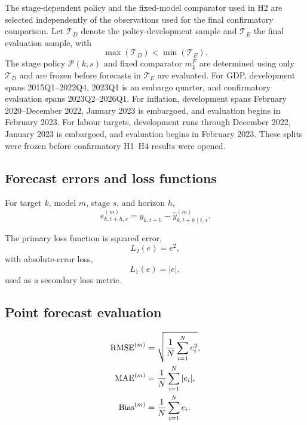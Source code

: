 The stage-dependent policy and the fixed-model comparator used in H2 are selected independently of the observations used for the final confirmatory comparison. Let $\mathcal{T}_{D}$ denote the policy-development sample and $\mathcal{T}_{E}$ the final evaluation sample, with
\begin{equation}
    \max(\mathcal{T}_{D}) < \min(\mathcal{T}_{E}).
    \label{eq:development_split}
\end{equation}
The stage policy $\mathcal{P}(k,s)$ and fixed comparator $m_k^{F}$ are determined using only $\mathcal{T}_{D}$ and are frozen before forecasts in $\mathcal{T}_{E}$ are evaluated. For GDP, development spans 2015Q1--2022Q4, 2023Q1 is an embargo quarter, and confirmatory evaluation spans 2023Q2--2026Q1. For inflation, development spans February 2020--December 2022, January 2023 is embargoed, and evaluation begins in February 2023. For labour targets, development runs through December 2022, January 2023 is embargoed, and evaluation begins in February 2023. These splits were frozen before confirmatory H1--H4 results were opened.

\subsection{Forecast errors and loss functions}
\label{subsec:forecast_errors}

For target $k$, model $m$, stage $s$, and horizon $h$,
\begin{equation}
    e_{k,t+h,s}^{(m)}
    =
    y_{k,t+h}
    -
    \widehat{y}_{k,t+h\mid t,s}^{(m)}.
    \label{eq:forecast_error}
\end{equation}

The primary loss function is squared error,
\begin{equation}
    L_2(e)=e^2,
    \label{eq:squared_loss}
\end{equation}
with absolute-error loss,
\begin{equation}
    L_1(e)=|e|,
    \label{eq:absolute_loss}
\end{equation}
used as a secondary loss metric.

\subsection{Point forecast evaluation}
\label{subsec:point_metrics}

\begin{align}
    \operatorname{RMSE}^{(m)}
    &=
    \sqrt{\frac{1}{N}\sum_{i=1}^{N}e_i^2},
    \label{eq:rmse}\\
    \operatorname{MAE}^{(m)}
    &=
    \frac{1}{N}\sum_{i=1}^{N}|e_i|,
    \label{eq:mae}\\
    \operatorname{Bias}^{(m)}
    &=
    \frac{1}{N}\sum_{i=1}^{N}e_i.
    \label{eq:bias}
\end{align}

